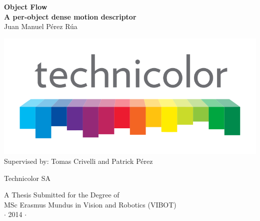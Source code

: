 
\newpage
\thispagestyle{empty}


\vspace*{1cm}
\begin{center}
{\huge\bf Object Flow\\}
{\large\bf A per-object dense motion descriptor\\}
\vspace{2cm} 
{\large Juan Manuel P\'erez R\'ua\\}
\vspace{1cm} 

\includegraphics[height=0.185\textheight]{images/logo/technicolor_large.png} \\

\vspace{1cm}
Supervised by: Tomas Crivelli and Patrick P\'erez

\vspace{1cm} 
\normalsize{Technicolor SA \\}%
\end{center}

\vspace{3cm}
\begin{center}
{\large A Thesis Submitted for the Degree of \\MSc Erasmus Mundus
in Vision and Robotics (VIBOT) \\\vspace{0.3cm} $\cdot$ 2014
$\cdot$}
\end{center}
\singlespacing
